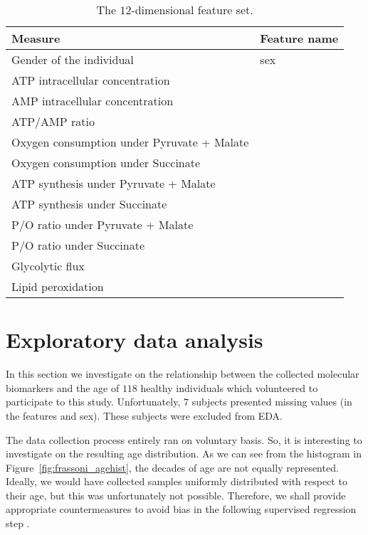 \begin{table}[]
	\centering
	\caption{The $12$-dimensional feature set.}
	\label{tab:aging_features}
	\begin{tabular}{@{}ll@{}}
		\toprule
		\textbf{Measure}                                    & \textbf{Feature name}\\ \midrule
		Gender of the individual                      & sex          \\
		ATP intracellular concentration            & \atp         \\
		AMP intracellular concentration            & \amp         \\
		ATP/AMP ratio                              & \atpamp      \\
		Oxygen consumption under Pyruvate + Malate & \copyrmal    \\
		Oxygen consumption under Succinate         & \cosucc      \\
		ATP synthesis under Pyruvate + Malate      & \atppyrmal   \\
		ATP synthesis under Succinate              & \atpsucc     \\
		P/O ratio under Pyruvate + Malate          & \popyrmal    \\
		P/O ratio under Succinate                  & \posucc      \\
		Glycolytic flux                            & \ldh         \\
		Lipid peroxidation                         & \mda         \\ \bottomrule
	\end{tabular}
\end{table}


\section{Exploratory data analysis} \label{sec:frassoni_EDA}
In this section we investigate on the relationship between the collected molecular biomarkers and the age of $118$ healthy individuals which volunteered to participate to this study.
Unfortunately, $7$ subjects presented missing values (in the features \ldh and sex). These subjects were excluded from EDA.


The data collection process entirely ran on voluntary basis. So, it is interesting to investigate on the resulting age distribution. As we can see from the histogram in Figure~\ref{fig:frassoni_agehist}, the decades of age are not equally represented. Ideally, we would have collected samples uniformly distributed with respect to their age, but this was unfortunately not possible. Therefore, we shall provide appropriate countermeasures to avoid bias in the following supervised regression step .

